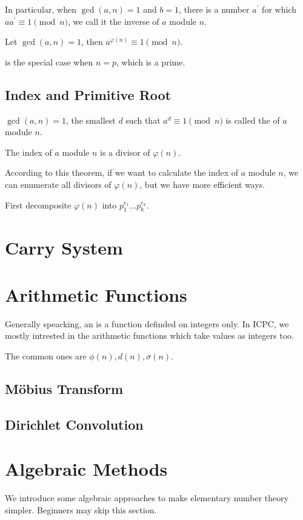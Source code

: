 In particular, when $\gcd(a, n) = 1$ and $b = 1$, there is a number $a^\prime$
for which $aa^\prime \equiv 1 \pmod n$, we call it the inverse of $a$ module $n$.

\begin{thm}
Let $\gcd(a, n) = 1$, then $a^{\varphi(n)} \equiv 1 \pmod n$.
\end{thm}
 is the special case when $n = p$, which is a prime.

\subsection{Index and Primitive Root}
$\gcd(a, n) = 1$, the smallest $d$ such that $a^d \equiv 1 \pmod n$ is called the
 of $a$ module $n$.

\begin{thm}
The index of $a$ module $n$ is a divisor of $\varphi(n)$.
\end{thm}
According to this theorem, if we want to calculate the index of $a$ module $n$,
we can enumerate all divisors of $\varphi(n)$, but we have more efficient ways.

First decomposite $\varphi(n)$ into $p_1^{e_1} \dots p_k^{e_k}$.

\section{Carry System}

\section{Arithmetic Functions}
Generally speacking, an  is a function definded on integers only.
In ICPC, we mostly intrested in the arithmetic functions which take values as integers too.

The common ones are $\phi(n), d(n), \sigma(n)$.

\subsection{M\"obius Transform}
\subsection{Dirichlet Convolution}

\section{Algebraic Methods}
We introduce some algebraic approaches to make elementary number theory simpler.
Beginners may skip this section.

